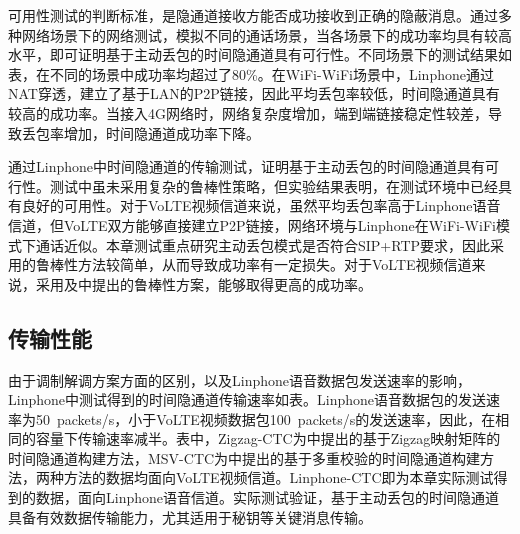 可用性测试的判断标准，是隐通道接收方能否成功接收到正确的隐蔽消息。通过多种网络场景下的网络测试，模拟不同的通话场景，当各场景下的成功率均具有较高水平，即可证明基于主动丢包的时间隐通道具有可行性。不同场景下的测试结果如表，在不同的场景中成功率均超过了80\%。在WiFi-WiFi场景中，Linphone通过NAT穿透，建立了基于LAN的P2P链接，因此平均丢包率较低，时间隐通道具有较高的成功率。当接入4G网络时，网络复杂度增加，端到端链接稳定性较差，导致丢包率增加，时间隐通道成功率下降。

通过Linphone中时间隐通道的传输测试，证明基于主动丢包的时间隐通道具有可行性。测试中虽未采用复杂的鲁棒性策略，但实验结果表明，在测试环境中已经具有良好的可用性。对于VoLTE视频信道来说，虽然平均丢包率高于Linphone语音信道，但VoLTE双方能够直接建立P2P链接，网络环境与Linphone在WiFi-WiFi模式下通话近似。本章测试重点研究主动丢包模式是否符合SIP+RTP要求，因此采用的鲁棒性方法较简单，从而导致成功率有一定损失。对于VoLTE视频信道来说，采用及中提出的鲁棒性方案，能够取得更高的成功率。

\subsection{传输性能}
\label{chap:linphone:result:throughput}


由于调制解调方案方面的区别，以及Linphone语音数据包发送速率的影响，Linphone中测试得到的时间隐通道传输速率如表。Linphone语音数据包的发送速率为50\ packets/s，小于VoLTE视频数据包100\ packets/s的发送速率，因此，在相同的容量下传输速率减半。表中，Zigzag-CTC为中提出的基于Zigzag映射矩阵的时间隐通道构建方法，MSV-CTC为中提出的基于多重校验的时间隐通道构建方法，两种方法的数据均面向VoLTE视频信道。Linphone-CTC即为本章实际测试得到的数据，面向Linphone语音信道。实际测试验证，基于主动丢包的时间隐通道具备有效数据传输能力，尤其适用于秘钥等关键消息传输。